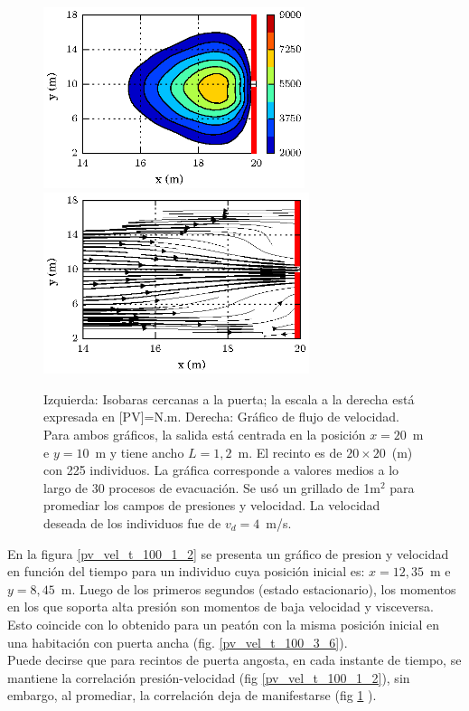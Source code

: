 \begin{figure}[H]
    \centering
    \includegraphics[height=5.3cm]{figuras/fig4_version0.eps}
        \includegraphics[height=5.3cm]{figuras/flujo_door_1_2m.eps}
    \caption[width=5cm]{Izquierda: Isobaras cercanas a la puerta; la escala a la derecha está expresada en [PV]=N.m. Derecha: Gráfico de flujo de velocidad. Para ambos gráficos, la salida está centrada en la posición $x=20$~m e $y=10$~m y tiene ancho $L=1,2$~m. El recinto es de $20\times 20$~(m) con 225 individuos. La gráfica corresponde a valores medios a lo largo de 30 procesos de evacuación. Se usó un grillado de 1m$^2$ para promediar los campos de presiones y velocidad. La velocidad deseada de los individuos fue de $v_d=4$~m/s.}
    \label{isobaras_flujo_1_2m}
\end{figure}
En la figura \ref{pv_vel_t_100_1_2} se presenta un gráfico de presion y velocidad en función del tiempo para un individuo cuya posición inicial es: $x=12,35$~m e $y=8,45$~m. Luego de los primeros segundos (estado estacionario), los momentos en los que soporta alta presión son momentos de baja velocidad y visceversa. Esto coincide con lo obtenido para un peatón con la misma posición inicial en una habitación con puerta ancha (fig. \ref{pv_vel_t_100_3_6}). \\
Puede decirse que para recintos de puerta angosta, en cada instante de tiempo, se mantiene la correlación presión-velocidad (fig \ref{pv_vel_t_100_1_2}), sin embargo, al promediar, la correlación deja de manifestarse (fig \ref{isobaras_flujo_1_2m} ). \\
